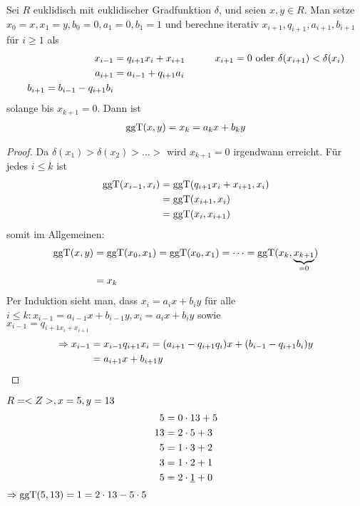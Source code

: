 \begin{proposition}
	Sei $R$ euklidisch mit euklidischer Gradfunktion $\delta$, und seien $x,y \in R$. Man setze $x_0 = x, x_1 = y, b_0 = 0, a_1 = 0, b_1 = 1$ und berechne iterativ $x_{i+1}, q_{i+1}, a_{i+1}, b_{i+1}$ für $i \ge 1$ als
	\begin{align}
		x_{i-1} &= q_{i+1}x_i + x_{i+1} &\qquad &x_{i+1} = 0 \text{ oder } \delta(x_{i+1}) < \delta(x_i) \notag \\
		a_{i+1} &= a_{i-1} + q_{i+1}a_i & & \notag \\
		b_{i+1} = b_{i-1} - q_{i+1}b_i & & \notag
	\end{align}
	solange bis $x_{k+1} = 0$. Dann ist
	\begin{align}
		\operatorname{ggT}(x,y) = x_k = a_k x + b_k y \notag
	\end{align}
\end{proposition}

\begin{proof}
	Da $\delta(x_1) > \delta(x_2) > \dots >$ wird $x_{k+1} = 0$ irgendwann erreicht. Für jedes $i \le k$ ist 
	\begin{align}
		\operatorname{ggT}(x_{i-1}, x_i) &= \operatorname{ggT}(q_{i+1}x_i + x_{i+1}, x_i)\notag \\
		&=\operatorname{ggT}(x_{i+1}, x_i) \notag \\
		&= \operatorname{ggT}(x_i, x_{i+1}) \notag
	\end{align}
	somit im Allgemeinen:
	\begin{align}
		\operatorname{ggT}(x,y) &= \operatorname{ggT}(x_0,x_1) = \operatorname{ggT}(x_0,x_1) = \dots = \operatorname{ggT}(x_k, \underbrace{x_{k+1}}_{=0})\notag \\
		&= x_k \notag
	\end{align}
	Per Induktion sieht man, dass $x_i = a_i x + b_i y$ für alle \\
	$i \le k: x_{i-1} = a_{i-1} x + b_{i-1}y, x_i = a_i x + b_i y$ sowie\\
	$x_{i-1} = q_{i+1 x_i + x_{i+1}}$\\
	\begin{align}
	\Rightarrow x_{i-1} &= x_{i-1}q_{i+1}x_i = (a_{i+1} - q_{i+1} q_i)x + (b_{i-1}-q_{i+1}b_i)y \notag\\
	&= a_{i+1}x + b_{i+1}y\notag
	\end{align}
\end{proof}

\begin{example}
	$R = <Z>, x = 5, y= 13$
	\begin{align}
	5 &= 0\cdot 13 + 5 \notag \\
	13 &= 2\cdot 5 + 3 \notag \\
	5 &= 1\cdot 3 + 2 \notag \\
	3 &= 1\cdot 2 + 1 \notag \\
	5 &= 2\cdot \underline{1} + 0 \notag \\
	\end{align}
	$\Rightarrow \operatorname{ggT}(5,13) = 1 = 2\cdot 13 - 5 \cdot 5$ %
\end{example}

